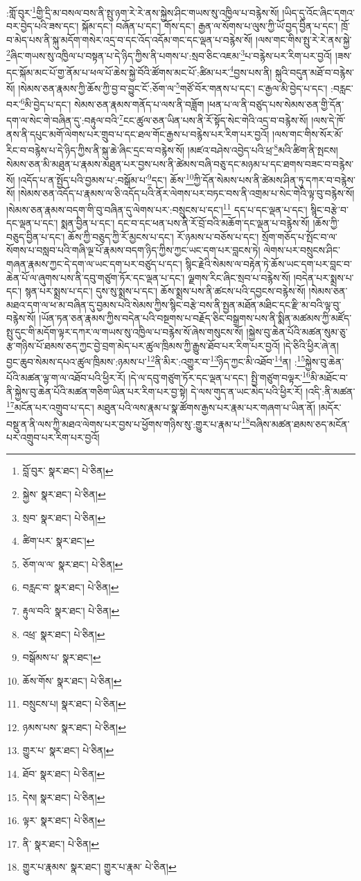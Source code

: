 :གློ་བུར་\footnote{བློ་བུར་  སྣར་ཐང་།  པེ་ཅིན། }གྱི་དྲི་མ་བསལ་བས་ནི་སྤུ་ཉག་རེ་རེ་ནས་སྐྱེས་ཤིང་གཡས་སུ་འཁྱིལ་པ་བརྙེས་སོ། །ཡིད་དུ་འོང་ཞིང་དགའ་བར་བྱེད་པའི་ཟས་དང་། སྐོམ་དང་། བཞོན་པ་དང་། གོས་དང་། རྒྱན་ལ་སོགས་པ་ལུས་ཀྱི་ཡོ་བྱད་བྱིན་པ་དང་། ཁྲོ་བ་མེད་པས་ནི་སྐུ་མདོག་གསེར་འདྲ་བ་དང་འོད་འདོམ་གང་དང་ལྡན་པ་བརྙེས་སོ། །ལས་གང་གིས་སྤུ་རེ་རེ་ནས་སྐྱེ་\footnote{སྐྱེས་  སྣར་ཐང་།  པེ་ཅིན། }ཞིང་གཡས་སུ་འཁྱིལ་པ་བསྟན་པ་དེ་ཉིད་ཀྱིས་ནི་པགས་པ་:སྲབ་ཅིང་འཇམ་\footnote{སྲབ་  སྣར་ཐང་།  པེ་ཅིན། }པ་བརྙེས་པར་རིག་པར་བྱའོ། །ཟས་དང་སྐོམ་མང་པོ་གྱ་ནོམ་པ་ཕལ་པོ་ཆེས་སྐྱེ་བོའི་ཚོགས་མང་པོ་:ཚིམ་པར་\footnote{ཚིག་པར་  སྣར་ཐང་། }བྱས་པས་ནི། སྐུའི་བདུན་མཐོ་བ་བརྙེས་སོ། །སེམས་ཅན་རྣམས་ཀྱི་ཆོས་ཀྱི་བྱ་བ་བྱུང་ངོ་:ཅོག་ལ་\footnote{ཅོག་ལ་ལ་  སྣར་ཐང་།  པེ་ཅིན། }གཙོ་བོར་གནས་པ་དང་། ང་རྒྱལ་མི་བྱེད་པ་དང་། :བརླང་བར་\footnote{བརླང་བ་  སྣར་ཐང་།  པེ་ཅིན། }མི་བྱེད་པ་དང་། སེམས་ཅན་རྣམས་གནོད་པ་ལས་ནི་བཟློག །ཕན་པ་ལ་ནི་བཙུད་པས་སེམས་ཅན་གྱི་དོན་དག་ལ་སེང་གེ་བཞིན་དུ་:བརྟུལ་བའི་\footnote{རྟུལ་བའི་  སྣར་ཐང་།  པེ་ཅིན། }ངང་ཚུལ་ཅན་ཡིན་པས་ནི་རོ་སྟོད་སེང་གེའི་འདྲ་བ་བརྙེས་སོ། །ལས་དེ་ཁོ་ནས་ནི་དཔུང་མགོ་ལེགས་པར་གྲུབ་པ་དང་ཐལ་གོང་རྒྱས་པ་བརྙེས་པར་རིག་པར་བྱའོ། །ལས་གང་གིས་སོར་མོ་རིང་བ་བརྙེས་པ་དེ་ཉིད་ཀྱིས་ནི་སྐུ་ཆེ་ཞིང་དྲང་བ་བརྙེས་སོ། །མཛའ་བཤེས་འབྱེད་པའི་ཕྲ་\footnote{འཕྲ་  སྣར་ཐང་།  པེ་ཅིན། }མའི་ཚིག་ནི་སྤངས། སེམས་ཅན་མི་མཐུན་པ་རྣམས་མཐུན་པར་བྱས་པས་ནི་ཚེམས་བཞི་བཅུ་དང་མཉམ་པ་དང་ཐགས་བཟང་བ་བརྙེས་སོ། །འདོད་པ་ན་སྤྱོད་པའི་བྱམས་པ་:བསྒོམ་པ་\footnote{བསྒོམས་པ་  སྣར་ཐང་། }དང་། ཆོས་\footnote{ཆོས་གོས་  སྣར་ཐང་།  པེ་ཅིན། }ཀྱི་དོན་སེམས་པས་ནི་ཚེམས་ཤིན་ཏུ་དཀར་བ་བརྙེས་སོ། །སེམས་ཅན་འདོད་པ་རྣམས་ལ་ཅི་འདོད་པའི་ནོར་ལེགས་པར་བཏང་བས་ནི་འགྲམ་པ་སེང་གེའི་ལྟ་བུ་བརྙེས་སོ། །སེམས་ཅན་རྣམས་བདག་གི་བུ་བཞིན་དུ་ལེགས་པར་:བསྲུངས་པ་དང་།\footnote{བསྲུངས་པ།  སྣར་ཐང་།  པེ་ཅིན། } དད་པ་དང་ལྡན་པ་དང་། སྙིང་བརྩེ་བ་དང་ལྡན་པ་དང་། སྨན་བྱིན་པ་དང་། དང་བ་དང་ཕན་པས་ནི་རོ་བྲོ་བའི་མཆོག་དང་ལྡན་པ་བརྙེས་སོ། །ཆོས་ཀྱི་བཅུད་བྱིན་པ་དང་། ཆོས་ཀྱི་བཅུད་ཀྱི་རོ་མྱངས་པ་དང་། རོ་ཉམས་པ་བཅོས་པ་དང་། སྲོག་གཅོད་པ་སྤོང་བ་ལ་སོགས་པ་བསླབ་པའི་གཞི་ལྔ་པོ་རྣམས་བདག་ཉིད་ཀྱིས་ཀྱང་ཡང་དག་པར་བླངས་ཏེ། ལེགས་པར་བསྲུངས་ཤིང་གཞན་རྣམས་ཀྱང་དེ་དག་ལ་ཡང་དག་པར་བཙུད་པ་དང་། སྙིང་རྗེའི་སེམས་ལ་བརྟེན་ཏེ་ཆོས་ཡང་དག་པར་བླང་བ་ཆེན་པོ་ལ་ཞུགས་པས་ནི་དབུ་གཙུག་ཏོར་དང་ལྡན་པ་དང་། ལྗགས་རིང་ཞིང་སྲབ་པ་བརྙེས་སོ། །བདེན་པར་སྨྲས་པ་དང་། སྙན་པར་སྨྲས་པ་དང་། དུས་སུ་སྨྲས་པ་དང་། ཆོས་སྨྲས་པས་ནི་ཚངས་པའི་དབྱངས་བརྙེས་སོ། །སེམས་ཅན་མཐའ་དག་ལ་ཕ་མ་བཞིན་དུ་བྱམས་པའི་སེམས་ཀྱིས་སྙིང་བརྩེ་བས་ནི་སྤྱན་མཐོན་མཐིང་དང་རྫི་མ་བའི་ལྟ་བུ་བརྙེས་སོ། །ཡོན་ཏན་ཅན་རྣམས་ཀྱིས་བདེན་པའི་བསྔགས་པ་བརྗོད་ཅིང་བསྒྲགས་པས་ནི་སྨིན་མཚམས་ཀྱི་མཛོད་སྤུ་དུང་གི་མདོག་ལྟར་དཀར་ལ་གཡས་སུ་འཁྱིལ་པ་བརྙེས་སོ་ཞེས་གསུངས་སོ། །སྐྱེས་བུ་ཆེན་པོའི་མཚན་སུམ་ཅུ་རྩ་གཉིས་པོ་ཐམས་ཅད་ཀྱང་བྱེ་བྲག་མེད་པར་ཚུལ་ཁྲིམས་ཀྱི་རྒྱུས་ཐོབ་པར་རིག་པར་བྱའོ། །དེ་ཅིའི་ཕྱིར་ཞེ་ན། བྱང་ཆུབ་སེམས་དཔའ་ཚུལ་ཁྲིམས་:ཉམས་པ་\footnote{ཉམས་པས་  སྣར་ཐང་།  པེ་ཅིན། }ནི་མིར་:འགྱུར་བ་\footnote{གྱུར་པ་  སྣར་ཐང་།  པེ་ཅིན། }ཉིད་ཀྱང་མི་འཐོབ་\footnote{ཐོབ་  སྣར་ཐང་།  པེ་ཅིན། }ན། :\footnote{དེས།   སྣར་ཐང་།  པེ་ཅིན། }སྐྱེས་བུ་ཆེན་པོའི་མཚན་ལྟ་ག་ལ་འཐོབ་པའི་ཕྱིར་རོ། །དེ་ལ་དབུ་གཙུག་ཏོར་དང་ལྡན་པ་དང་། སྤྱི་གཙུག་བལྟར་\footnote{ལྟར་  སྣར་ཐང་།  པེ་ཅིན། }མི་མཐོང་བ་ནི་སྐྱེས་བུ་ཆེན་པོའི་མཚན་གཅིག་ཡིན་པར་རིག་པར་བྱ་སྟེ། དེ་ལས་གུད་ན་ཡང་མེད་པའི་ཕྱིར་རོ། །འདི་:ནི་མཚན་\footnote{ནི་  སྣར་ཐང་།  པེ་ཅིན། }མངོན་པར་འགྲུབ་པ་དང་། མཐུན་པའི་ལས་རྣམ་པ་སྣ་ཚོགས་རྒྱས་པར་རྣམ་པར་གཞག་པ་ཡིན་ནོ། །མདོར་བསྡུ་ན་ནི་ལས་ཀྱི་མཐའ་ལེགས་པར་བྱས་པ་ཕྱོགས་གཉིས་སུ་:གྱུར་པ་རྣམ་པ་\footnote{གྱུར་པ་རྣམས་  སྣར་ཐང་། གྱུར་པ་རྣམ་  པེ་ཅིན། }བཞིས་མཚན་ཐམས་ཅད་མངོན་པར་འགྲུབ་པར་རིག་པར་བྱའོ། 